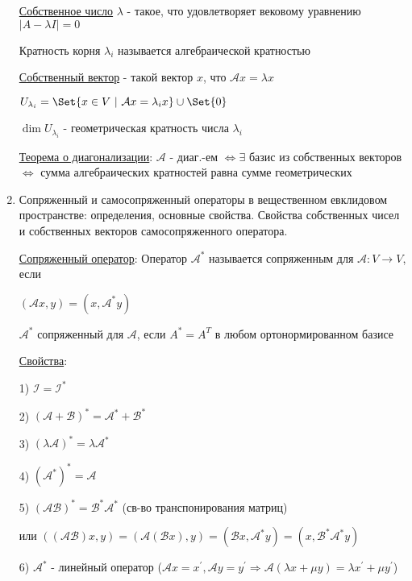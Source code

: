 \documentclass[12pt]{article}
\begin{document}
\begin{enumerate}
        \hyperlink{eigenvalue}{Собственное число} $\lambda$ - такое, что удовлетворяет вековому уравнению $|A - \lambda I| = 0$

        Кратность корня $\lambda_i$ называется алгебраической кратностью

        \hyperlink{eigenvector}{Собственный вектор} - такой вектор $x$, что $\mathcal{A}x = \lambda x$

        $U_{\lambda_i} = \Set{x \in V \ | \ \mathcal{A}x = \lambda_i x} \union \Set{0}$

        $\dim U_{\lambda_i}$ - геометрическая кратность числа $\lambda_i$

        \hyperlink{diagonalizedmatrixtheorem}{Теорема о диагонализации}: $\mathcal{A}$ - диаг.-ем $\Longleftrightarrow \exists$ базис из собственных векторов $\Longleftrightarrow$ сумма алгебраических кратностей равна сумме геометрических

        \item Сопряженный и самосопряженный операторы в вещественном евклидовом пространстве: определения, основные свойства. Свойства собственных чисел и собственных векторов самосопряженного оператора.

        \hyperlink{conjugateoperator}{Сопряженный оператор}: Оператор $\mathcal{A}^*$ называется сопряженным для $\mathcal{A} : V \to V$, если

        $(\mathcal{A}x, y) = (x, \mathcal{A}^* y)$

        $\mathcal{A}^*$ сопряженный для $\mathcal{A}$, если $A^* = A^T$ в любом ортонормированном базисе

        \hyperlink{conjugateoperatorproperties}{Свойства}:

        1) $\mathcal{I} = \mathcal{I}^*$

        2) $(\mathcal{A} + \mathcal{B})^* = \mathcal{A}^* + \mathcal{B}^*$

        3) $(\lambda \mathcal{A})^* = \lambda \mathcal{A}^*$

        4) $(\mathcal{A}^*)^* = \mathcal{A}$

        5) $(\mathcal{A}\mathcal{B})^* = \mathcal{B}^* \mathcal{A}^*$ (св-во транспонирования матриц)

        или $((\mathcal{AB})x, y) = (\mathcal{A}(\mathcal{B}x), y) = (\mathcal{B}x, \mathcal{A}^* y) = (x, \mathcal{B}^* \mathcal{A}^* y)$

        6) $\mathcal{A}^*$ - линейный оператор ($\mathcal{A}x = x^\prime, \mathcal{A}y = y^\prime \Longrightarrow \mathcal{A}(\lambda x + \mu y) = \lambda x^\prime + \mu y^\prime$)


\end{enumerate}
\end{document}
